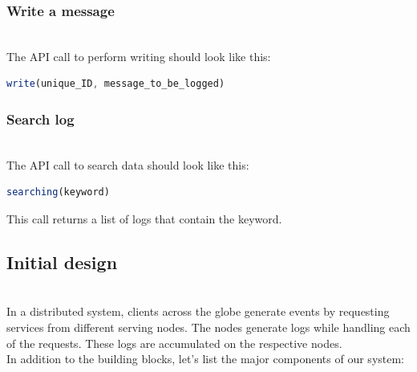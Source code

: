 \subsubsection{Write a message}\label{nUnCV8w31Tn7THCqYZd2a}
\\
The API call to perform writing should look like this:

\begin{lstlisting}[language=JavaScript]
write(unique_ID, message_to_be_logged)
\end{lstlisting}

\begin{table}[htbp]
\centering
\small
{}
\end{table}

\subsubsection{Search log}\label{XoEvOd5QhIk-4zLmVA7FF}
\\
The API call to search data should look like this:

\begin{lstlisting}[language=JavaScript]
searching(keyword)
\end{lstlisting}

This call returns a list of logs that contain the keyword.

\begin{table}[htbp]
\centering
\small
{}
\end{table}

\subsection{Initial design}\label{RkA-cf_cPf_y_KwzHfAYi}
\\
In a distributed system, clients across the globe generate events by requesting services from different serving nodes. The nodes generate logs while handling each of the requests. These logs are accumulated on the respective nodes.
\\
In addition to the building blocks, let's list the major components of our system:


